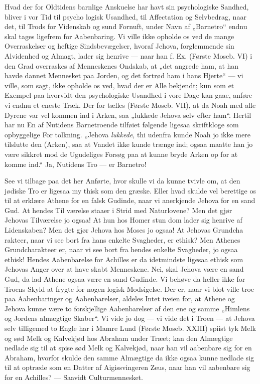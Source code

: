 \documentclass[12pt]{book}
\newcommand{\opage}[1]{\marginnote{\footnotesize\textit{[#1]}}}
\begin{document}
Hvad der for Oldtidens barnlige Anskuelse har havt
sin psychologiske Sandhed, bliver i vor Tid til psycho\-%
logisk Usandhed, til Affectation og Selvbedrag, naar det,
til Trods for Videnskab og sund Fornuft, under Navn
af „Barnetro“ endnu skal tages ligefrem for Aabenbaring.
Vi ville ikke opholde os ved de mange Overraskelser
og heftige Sindsbevægelser, hvoraf Jehova, forglemmende
sin Alvidenhed og Almagt, lader sig henrive --- naar
\opage{99}\setcounter{footnote}{0}%
han f. Ex. (Første Moseb. VI) i den Grad overraskes
af Menneskenes Ondskab, at „det angrede ham, at han
havde dannet Mennesket paa Jorden, og det fortrød ham
i hans Hjerte“ --- vi ville, som sagt, ikke opholde os
ved, hvad der er Alle bekjendt; kun som et Exempel %
paa hvorvidt den psychologiske Usandhed i vore Dage
kan gaae, anføre vi endnu et eneste Træk. Der for\-%
tælles (Første Moseb. VII), at da Noah med alle Dyrene
var vel kommen ind i Arken, saa „lukkede Jehova selv
efter ham“. Hertil har nu En af Nutidens Barnetroende
tilføiet følgende ligesaa skriftkloge som opbyggelige For\-%
tolkning. „Jehova \emph{lukkede}, thi udenfra kunde Noah
jo ikke mere tilslutte den (Arken), saa at Vandet ikke
kunde trænge ind; ogsaa maatte han jo være sikkret
mod de Ugudeliges Forsøg paa at kunne bryde Arken
op for at komme ind.“ Ja, Nutidens Tro --- er Barnetro!

See vi tilbage paa det her Anførte, hvor skulle vi
da kunne tvivle om, at den jødiske Tro er ligesaa my\-%
thisk som den græske. Eller hvad skulde vel berettige
os til at erklære Athene for en falsk Gudinde, naar vi
anerkjende Jehova for en sand Gud. At hendes Til\-%
værelse staaer i Strid med Naturlovene? Men det gjør
Jehovas Tilværelse jo ogsaa! At hun hos Homer stun\-%
dom lader sig henrive af Lidenskaben? Men det gjør
Jehova hos Moses jo ogsaa! At Jehovas Grundcha\-%
rakteer, naar vi see bort fra hans enkelte Svagheder, er
ethisk? Men Athenes Grundcharakteer er, naar vi see
bort fra hendes enkelte Svagheder, jo ogsaa ethisk!
Hendes Aabenbarelse for Achilles er da idetmindste
ligesaa ethisk som Jehovas Anger over at have skabt
Menneskene. Nei, skal Jehova være en sand Gud, da
lad Athene ogsaa være en sand Gudinde. Vi behøve
da heller ikke for Troens Skyld at frygte for nogen
logisk Modsigelse. Der er, naar vi blot ville troe paa
\opage{100}\setcounter{footnote}{0}%
Aabenbaringer og Aabenbarelser, aldeles Intet iveien
for, at Athene og Jehova kunne være to forskjellige
Aabenbarelser af den ene og samme „Himlens og
Jordens almægtige Skaber“. Vi vide jo dog --- vi vide
det i Troen --- at Jehova selv tilligemed to Engle har
i Mamre Lund (Første Moseb. XXIII) spiist tyk Melk %
og sød Melk og Kalvekjød hos Abraham under Træet;
kan den Almægtige nedlade sig til at spise sød Melk og
Kalvekjød, naar han vil aabenbare sig for en Abraham,
hvorfor skulde den samme Almægtige da ikke ogsaa
kunne nedlade sig til at optræde som en Datter af
Aigissvingeren Zeus, naar han vil aabenbare sig for en
Achilles? --- Saavidt Culturmennesket.
\end{document}
